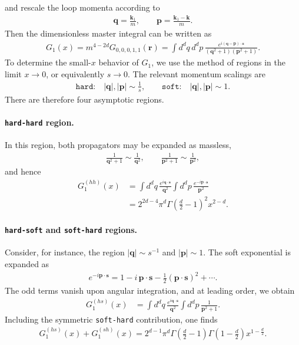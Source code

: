 and rescale the loop momenta according to
\begin{align}
\boldsymbol{q} = \frac{\boldsymbol{k}_1}{m},
\qquad
\boldsymbol{p} = \frac{\boldsymbol{k}_1-\boldsymbol{k}}{m}.
\end{align}
Then the dimensionless master integral can be written as
\begin{align}
G_1(x)
=
m^{4-2d} G_{0,0,0,1,1}(\boldsymbol{r})
=
\int d^d q\, d^d p\,
\frac{e^{i(\boldsymbol{q}-\boldsymbol{p})\cdot \boldsymbol{s}}}{(\boldsymbol{q}^2+1)(\boldsymbol{p}^2+1)}.
\end{align}
To determine the small-$x$ behavior of $G_1$, we use the method of regions in the limit $x \to 0$, or equivalently $s \to 0$. The relevant momentum scalings are
\begin{align}
\texttt{hard:}\quad |\boldsymbol{q}|,|\boldsymbol{p}| \sim \frac{1}{s},
\qquad
\texttt{soft:}\quad |\boldsymbol{q}|,|\boldsymbol{p}| \sim 1.
\end{align}
There are therefore four asymptotic regions.

\paragraph{\texttt{hard-hard} region.}
In this region, both propagators may be expanded as massless,
\begin{align}
\frac{1}{\boldsymbol{q}^2+1} \sim \frac{1}{\boldsymbol{q}^2},
\qquad
\frac{1}{\boldsymbol{p}^2+1} \sim \frac{1}{\boldsymbol{p}^2},
\end{align}
and hence
\begin{align}
G_1^{(hh)}(x)
&=
\int d^d q\,\frac{e^{i\boldsymbol{q}\cdot \boldsymbol{s}}}{\boldsymbol{q}^2}
\int d^d p\,\frac{e^{-i\boldsymbol{p}\cdot \boldsymbol{s}}}{\boldsymbol{p}^2}
\nonumber\\
&=
2^{2d-4}\pi^d
\Gamma\!\left(\frac{d}{2}-1\right)^2
x^{2-d}.
\end{align}

\paragraph{\texttt{hard-soft} and \texttt{soft-hard} regions.}
Consider, for instance, the region $|\boldsymbol{q}| \sim s^{-1}$ and $|\boldsymbol{p}| \sim 1$. The soft exponential is expanded as
\begin{align}
e^{-i\boldsymbol{p}\cdot \boldsymbol{s}}
=
1 - i\,\boldsymbol{p}\cdot \boldsymbol{s} - \frac{1}{2}(\boldsymbol{p}\cdot \boldsymbol{s})^2 + \cdots.
\end{align}
The odd terms vanish upon angular integration, and at leading order, we obtain
\begin{align}
G_1^{(hs)}(x)
&=
\int d^d q\,\frac{e^{i\boldsymbol{q}\cdot \boldsymbol{s}}}{\boldsymbol{q}^2}
\int d^d p\,\frac{1}{\boldsymbol{p}^2+1}.
\end{align}
Including the symmetric \texttt{soft-hard} contribution, one finds
\begin{align}
G_1^{(hs)}(x) + G_1^{(sh)}(x)
=
2^{d-1}\pi^d
\Gamma\!\left(\frac{d}{2}-1\right)
\Gamma\!\left(1-\frac{d}{2}\right)
x^{1-\frac{d}{2}}.
\end{align}


